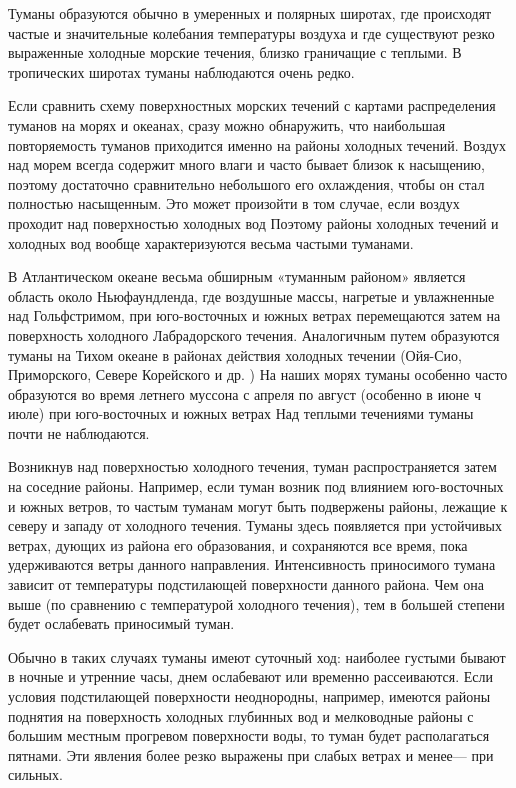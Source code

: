 Туманы образуются обычно в умеренных и полярных широтах, где происходят частые и значительные колебания температуры воздуха и где существуют резко выраженные холодные морские течения, близко граничащие с теплыми. В тропических широтах туманы наблюдаются очень редко.

Если сравнить схему поверхностных морских течений с картами распределения туманов на морях и океанах, сразу можно обнаружить, что наибольшая повторяемость туманов приходится именно на районы холодных течений. Воздух над морем всегда содержит много влаги и часто бывает близок к насыщению, поэтому достаточно сравнительно небольшого его охлаждения, чтобы он стал полностью насыщенным. Это может произойти в том случае, если воздух проходит над поверхностью холодных вод Поэтому районы холодных течений и холодных вод вообще характеризуются весьма частыми туманами.

В Атлантическом океане весьма обширным «туманным районом» является область около Ньюфаундленда, где воздушные массы, нагретые и увлажненные над Гольфстримом, при юго-восточных и южных ветрах перемещаются затем на поверхность холодного Лабрадорского течения. Аналогичным путем образуются туманы на Тихом океане в районах действия холодных течении (Ойя-Сио, Приморского, Севере Корейского и др. ) На наших морях туманы особенно часто образуются во время летнего муссона с апреля по август (особенно в июне ч июле) при юго-восточных и южных ветрах Над теплыми течениями туманы почти не наблюдаются.

Возникнув над поверхностью холодного течения, туман распространяется затем на соседние районы. Например, если туман возник под влиянием юго-восточных и южных ветров, то частым туманам могут быть подвержены районы, лежащие к северу и западу от холодного течения. Туманы здесь появляется при устойчивых ветрах, дующих из района его образования, и сохраняются все время, пока удерживаются ветры данного направления. Интенсивность приносимого тумана зависит от температуры подстилающей поверхности данного района. Чем она выше (по сравнению с температурой холодного течения), тем в большей степени будет ослабевать приносимый туман.

Обычно в таких случаях туманы имеют суточный ход: наиболее густыми бывают в ночные и утренние часы, днем ослабевают или временно рассеиваются. Если условия подстилающей поверхности неоднородны, например, имеются районы поднятия на поверхность холодных глубинных вод и мелководные районы с большим местным прогревом поверхности воды, то туман будет располагаться пятнами. Эти явления более резко выражены при слабых ветрах и менее— при сильных.

